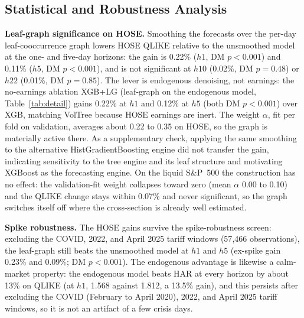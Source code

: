 \documentclass[runningheads]{llncs}
\begin{document}
\subsection{Statistical and Robustness Analysis}\label{sec:robust}
\textbf{Leaf-graph significance on HOSE.} Smoothing the forecasts over the per-day leaf-cooccurrence graph
lowers HOSE QLIKE relative to the unsmoothed model at the one- and five-day
horizons: the gain is 0.22\% ($h1$, DM $p<0.001$) and 0.11\% ($h5$, DM $p<0.001$), and is not
significant at $h10$ (0.02\%, DM $p=0.48$) or $h22$ (0.01\%, DM $p=0.85$).
The lever is endogenous denoising, not earnings: the no-earnings ablation XGB+LG (leaf-graph on the
endogenous model, Table~\ref{tab:detail}) gains 0.22\% at $h1$ and 0.12\% at $h5$ (both DM $p<0.001$) over
XGB, matching VolTree because HOSE earnings are inert.
The weight $\alpha$, fit per fold on validation, averages about 0.22 to 0.35 on HOSE, so the graph is
materially active there. As a supplementary check, applying the same smoothing to the alternative
HistGradientBoosting engine did not transfer the gain, indicating sensitivity to the tree engine and its
leaf structure and motivating XGBoost as the forecasting engine. On the liquid S\&P~500 the construction
has no effect: the validation-fit weight collapses toward zero (mean $\alpha$ 0.00 to 0.10) and the QLIKE
change stays within 0.07\% and never significant, so the graph switches itself off where the cross-section
is already well estimated.

\textbf{Spike robustness.} The HOSE gains survive the spike-robustness screen: excluding the COVID, 2022,
and April 2025 tariff windows (57{,}466 observations), the leaf-graph still beats the unsmoothed model at
$h1$ and $h5$ (ex-spike gain 0.23\% and 0.09\%; DM $p<0.001$).
The endogenous advantage is likewise a calm-market property: the endogenous model beats HAR at every
horizon by about 13\% on QLIKE (at $h1$, 1.568 against 1.812, a 13.5\% gain), and this persists after
excluding the COVID (February to April 2020), 2022, and April 2025 tariff windows, so it is not an
artifact of a few crisis days.
\end{document}
